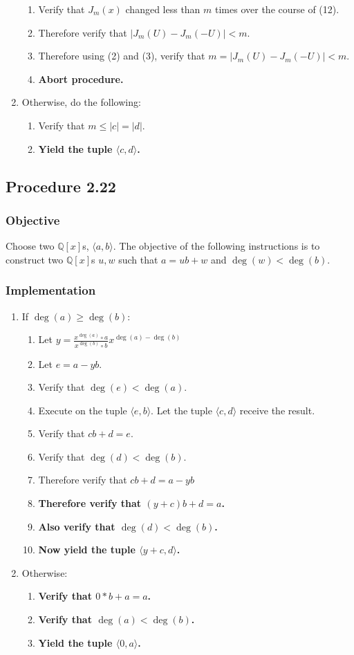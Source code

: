 \documentclass[twocolumn]{article}
\newcommand{\procedure}[2][]{\subsection*{Procedure #2 \ifthenelse{\equal{#1}{}}{}{(#1)}}\label{sec:procedure #2}}
\newcommand{\objective}{\subsubsection*{Objective}}
\newcommand{\implementation}{\subsubsection*{Implementation}}
\newcommand{\procedurehr}[2][]{\hyperref[sec:procedure #2]{\ifthenelse{\equal{#1}{}}{procedure #2}{#1}}}
\begin{document}
\begin{enumerate}
\begin{enumerate}
						\item Verify that $J_m(x)$ changed less than $m$ times over the course of (12).
						\item Therefore verify that $\lvert J_m(U)-J_m(-U)\rvert<m$.
						\item Therefore using (2) and (3), verify that $m=\lvert J_m(U)-J_m(-U)\rvert<m$.
						\item \textbf{Abort procedure.}
					\end{enumerate}
					\item Otherwise, do the following:
					\begin{enumerate}
						\item Verify that $m\le\lvert c\rvert=\lvert d\rvert$.
						\item \textbf{Yield the tuple $\langle c,d\rangle$.}
					\end{enumerate}
				\end{enumerate}
		\procedure{2.22}
			\objective
				Choose two $\mathbb{Q}[x]$s, $\langle a,b\rangle$. The objective of the following instructions is to construct two $\mathbb{Q}[x]$s $u,w$ such that $a=ub+w$ and $\deg(w)<\deg(b)$.
			\implementation
				\begin{enumerate}
					\item If $\deg(a)\ge\deg(b)$:
					\begin{enumerate}
						\item Let $y=\frac{x^{\deg(a)}\circ a}{x^{\deg(b)}\circ b}x^{\deg(a)-\deg(b)}$
						\item Let $e=a-yb$.
						\item Verify that $\deg(e)<\deg(a)$.
						\item Execute \procedurehr{2.22} on the tuple $\langle e,b\rangle$. Let the tuple $\langle c,d\rangle$ receive the result.
						\item Verify that $cb+d=e$.
						\item Verify that $\deg(d)<\deg(b)$.
						\item Therefore verify that $cb+d=a-yb$
						\item \textbf{Therefore verify that $(y+c)b+d=a$.}
						\item \textbf{Also verify that $\deg(d)<\deg(b)$.}
						\item \textbf{Now yield the tuple $\langle y+c, d\rangle$.}
					\end{enumerate}
					\item Otherwise:
					\begin{enumerate}
						\item \textbf{Verify that $0*b+a=a$.}
						\item \textbf{Verify that $\deg(a)<\deg(b)$.}
						\item \textbf{Yield the tuple $\langle 0,a\rangle$.}
					\end{enumerate}
				\end{enumerate}
\end{document}
